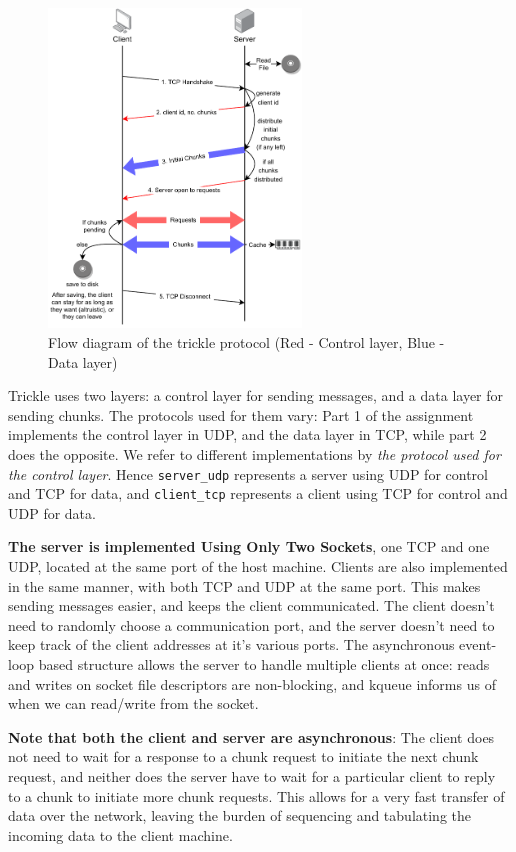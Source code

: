 \documentclass[12pt]{article}
\begin{document}
\begin{figure}[H]
  \centering
  \includegraphics[width=0.6\textwidth]{protocol.pdf}
  \caption{Flow diagram of the trickle protocol (Red - Control layer, Blue - Data layer)}
\end{figure}

Trickle uses two layers: a control layer for sending messages, and a data layer for sending chunks. The protocols used for them vary: Part 1 of the assignment implements the control layer in UDP, and the data layer in TCP, while part 2 does the opposite. We refer to different implementations by \emph{the protocol used for the control layer}. Hence \texttt{server\_udp} represents a server using UDP for control and TCP for data, and \texttt{client\_tcp} represents a client using TCP for control and UDP for data. 

\textbf{The server is implemented Using Only Two Sockets}, one TCP and one UDP, located at the same port of the host machine. Clients are also implemented in the same manner, with both TCP and UDP at the same port. This makes sending messages easier, and keeps the client communicated. The client doesn't need to randomly choose a communication port, and the server doesn't need to keep track of the client addresses at it's various ports. The asynchronous event-loop based structure allows the server to handle multiple clients at once: reads and writes on socket file descriptors are non-blocking, and kqueue informs us of when we can read/write from the socket.

\textbf{Note that both the client and server are asynchronous}: The client does not need to wait for a response to a chunk request to initiate the next chunk request, and neither does the server have to wait for a particular client to reply to a chunk to initiate more chunk requests. This allows for a very fast transfer of data over the network, leaving the burden of sequencing and tabulating the incoming data to the client machine.
\end{document}
